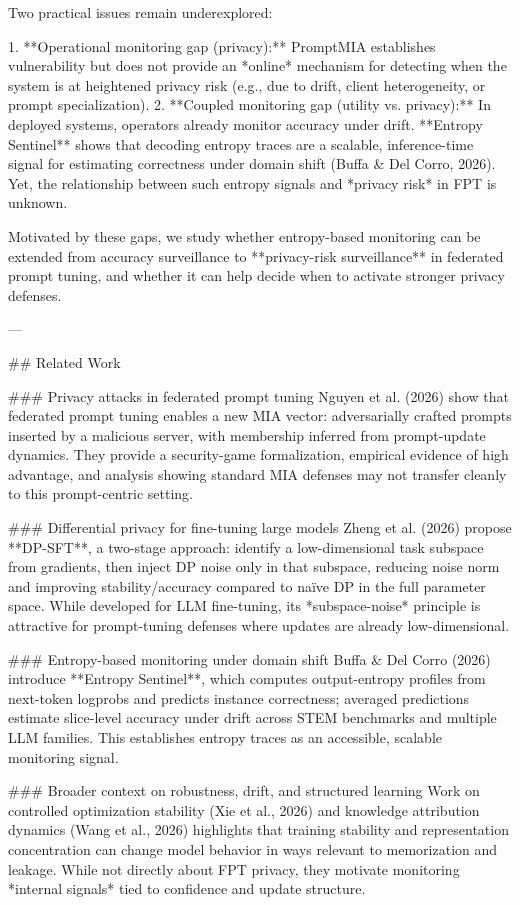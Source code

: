 Two practical issues remain underexplored:

1. **Operational monitoring gap (privacy):** PromptMIA establishes vulnerability but does not provide an *online* mechanism for detecting when the system is at heightened privacy risk (e.g., due to drift, client heterogeneity, or prompt specialization).  
2. **Coupled monitoring gap (utility vs. privacy):** In deployed systems, operators already monitor accuracy under drift. **Entropy Sentinel** shows that decoding entropy traces are a scalable, inference-time signal for estimating correctness under domain shift (Buffa & Del Corro, 2026). Yet, the relationship between such entropy signals and *privacy risk* in FPT is unknown.

Motivated by these gaps, we study whether entropy-based monitoring can be extended from accuracy surveillance to **privacy-risk surveillance** in federated prompt tuning, and whether it can help decide when to activate stronger privacy defenses.

---

## Related Work  

### Privacy attacks in federated prompt tuning  
Nguyen et al. (2026) show that federated prompt tuning enables a new MIA vector: adversarially crafted prompts inserted by a malicious server, with membership inferred from prompt-update dynamics. They provide a security-game formalization, empirical evidence of high advantage, and analysis showing standard MIA defenses may not transfer cleanly to this prompt-centric setting.

### Differential privacy for fine-tuning large models  
Zheng et al. (2026) propose **DP-SFT**, a two-stage approach: identify a low-dimensional task subspace from gradients, then inject DP noise only in that subspace, reducing noise norm and improving stability/accuracy compared to naïve DP in the full parameter space. While developed for LLM fine-tuning, its *subspace-noise* principle is attractive for prompt-tuning defenses where updates are already low-dimensional.

### Entropy-based monitoring under domain shift  
Buffa & Del Corro (2026) introduce **Entropy Sentinel**, which computes output-entropy profiles from next-token logprobs and predicts instance correctness; averaged predictions estimate slice-level accuracy under drift across STEM benchmarks and multiple LLM families. This establishes entropy traces as an accessible, scalable monitoring signal.

### Broader context on robustness, drift, and structured learning  
Work on controlled optimization stability (Xie et al., 2026) and knowledge attribution dynamics (Wang et al., 2026) highlights that training stability and representation concentration can change model behavior in ways relevant to memorization and leakage. While not directly about FPT privacy, they motivate monitoring *internal signals* tied to confidence and update structure.

